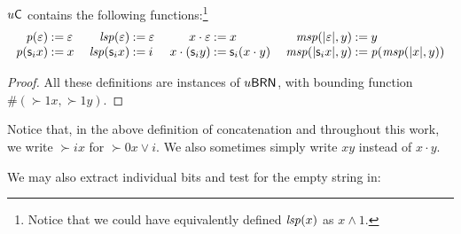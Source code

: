 \documentclass{lmcs}
\begin{document}
\begin{proposition}
	$u \mathsf{C}$ contains the following functions:\footnote{Notice that we could have equivalently defined $\mathit{lsp} (x) $ as $x \wedge 1$.}
	\[
	\arraycolsep=1.2pt
	\begin{array}{rcl}
	\pred (\epsilon) & \dfn & \epsilon \\
	\pred (\succ i x ) & \dfn & x
	\end{array}
	\quad
	\begin{array}{rcl}
	\lsp (\epsilon ) & \dfn & \epsilon \\
	\lsp (\succ i x) & \dfn & i
	\end{array}
	\quad
	\begin{array}{rcl}
	x \cdot \epsilon & \dfn & x \\
	x \cdot (\succ i y) & \dfn & \succ i (x\cdot y)
	\end{array}
	\quad
	\begin{array}{rcl}
	\msp (|\epsilon| , y) & \dfn & y \\
	\msp (|\succ i x| , y) & \dfn & \pred (\msp (|x|,y))
	\end{array}
	\]
\end{proposition}
\begin{proof}
	All these definitions are instances of $u\mathsf{BRN}$, with bounding function $\# (\succ 1 x,\succ 1 y)$.
\end{proof}
Notice that, in the above definition of concatenation and throughout this work, we write $\succ i x$ for $\succ 0 x \vee i$. We also sometimes simply write $xy$ instead of $x \cdot y$.


We may also extract individual bits
and test for the empty string in:
\end{document}
